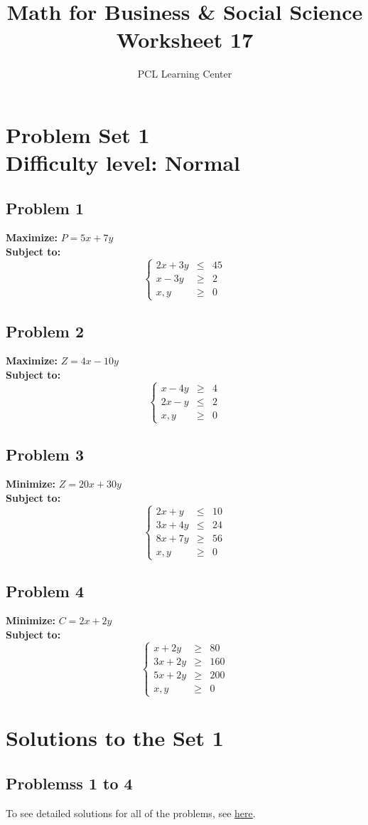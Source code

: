 \documentclass[12pt]{article}
\title{Math for Business \& Social Science\\ Worksheet 17}
\author{PCL Learning Center}
\date{}
\begin{document}
\maketitle

\section*{Problem Set 1\\Difficulty level: Normal}
\subsection*{Problem 1}
\textbf{Maximize:} \( P = 5x + 7y \) \\
\textbf{Subject to:}
\[
\left\{
\begin{array}{lcr}
2x + 3y & \leq & 45 \\
x - 3y & \geq & 2 \\
x, y & \geq & 0
\end{array}
\right.
\]

\subsection*{Problem 2}
\textbf{Maximize:} \( Z = 4x - 10y \) \\
\textbf{Subject to:}
\[
\left\{
\begin{array}{lcr}
x - 4y & \geq & 4 \\
2x - y & \leq & 2 \\
x, y & \geq & 0
\end{array}
\right.
\]

\subsection*{Problem 3}
\textbf{Minimize:} \( Z = 20x + 30y \) \\
\textbf{Subject to:}
\[
\left\{
\begin{array}{lcr}
2x + y & \leq & 10 \\
3x + 4y & \leq & 24 \\
8x + 7y & \geq & 56 \\
x, y & \geq & 0
\end{array}
\right.
\]

\subsection*{Problem 4}
\textbf{Minimize:} \( C = 2x + 2y \) \\
\textbf{Subject to:}
\[
\left\{
\begin{array}{lcr}
x + 2y & \geq & 80 \\
3x + 2y & \geq & 160 \\
5x + 2y & \geq & 200 \\
x, y & \geq & 0
\end{array}
\right.
\]


\newpage
\section*{Solutions to the Set 1}
\subsection*{Problemss 1 to 4}
To see detailed solutions for all of the problems, see \href{https://drive.google.com/file/d/1DbjG3rs9q-jIP3gDGax62e74oCtfA3r8/view?usp=sharing}{here}.
\end{document}
